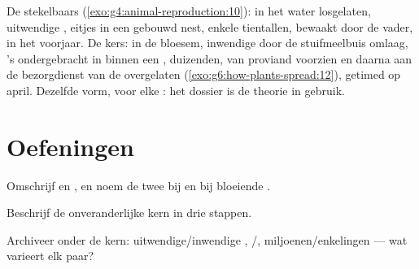 \begin{example}\label{ex:g8:sexual-reproduction:dossiers}
De stekelbaars (\cref{exo:g4:animal-reproduction:10}):  in het
water losgelaten, uitwendige , eitjes in een gebouwd nest,
enkele tientallen, bewaakt door de vader, in het voorjaar. De kers:
 in de bloesem, inwendige  door de stuifmeelbuis
omlaag, 's ondergebracht in  binnen een , duizenden,
van proviand voorzien en daarna aan de bezorgdienst van de 
overgelaten (\cref{exo:g6:how-plants-spread:12}), getimed op april.
Dezelfde vorm, voor elke : het dossier is de theorie in gebruik.
\end{example}

\section{Oefeningen}

\begin{exercise}[$\star$]\label{exo:g8:sexual-reproduction:1}
Omschrijf  en , en noem de twee  bij  en bij
bloeiende .
\end{exercise}

\begin{exercise}[$\star$]\label{exo:g8:sexual-reproduction:2}
Beschrijf de onveranderlijke kern in drie stappen.
\end{exercise}

\begin{exercise}[$\star$]\label{exo:g8:sexual-reproduction:3}
Archiveer onder de kern: uitwendige/inwendige ,
/, miljoenen/enkelingen --- wat varieert elk paar?
\end{exercise}

